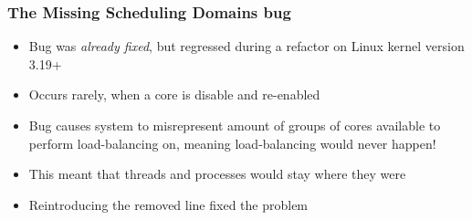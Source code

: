 \documentclass{beamer}
\newcommand{\linespace}{\vskip 0.25cm}
\begin{document}
\begin{frame}
\frametitle{The Missing Scheduling Domains bug}

\begin{itemize}
\item Bug was \emph{already fixed}, but regressed during a refactor on Linux kernel version 3.19+
\item Occurs rarely, when a core is disable and re-enabled

\linespace

\item Bug causes system to misrepresent amount of groups of cores available to perform load-balancing on, meaning load-balancing would never happen!

\item This meant that threads and processes would stay where they were

\linespace

	\item Reintroducing the removed line fixed the problem
\end{itemize}
\end{frame}
\end{document}
